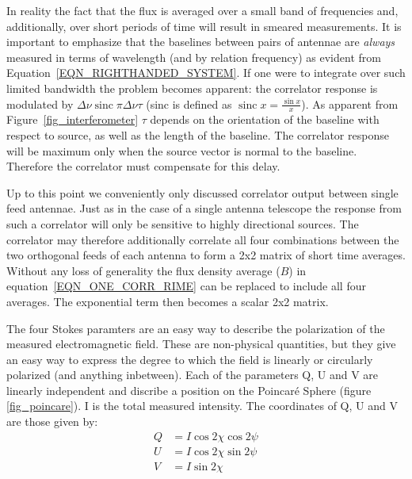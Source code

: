 \documentclass[a4paper,10pt]{report}
\DeclareMathOperator*{\sinc}{sinc}
\begin{document}
In reality the fact that the flux is averaged over a small band of frequencies and, additionally, over short periods of 
time will result in smeared measurements. It is important to emphasize that the baselines between pairs of antennae are 
\textit{always} measured in terms of wavelength (and by relation frequency) as evident from Equation~\ref{EQN_RIGHTHANDED_SYSTEM}.
If one were to integrate over such limited bandwidth the problem becomes apparent: the correlator response
is modulated by $\Delta\nu\sinc{\pi\Delta\nu\tau}$ (sinc is defined as $\sinc{x} = \frac{\sin{x}}{x}$). As apparent from
Figure~\ref{fig_interferometer} $\tau$ depends on the orientation of the baseline with respect to source, as well as the length of the 
baseline. The correlator response will be maximum only when the source vector is normal to the baseline. Therefore the 
correlator must compensate for this delay.

Up to this point we conveniently only discussed correlator output between single feed antennae.
Just as in the case of a single antenna telescope the response from such a correlator will only be sensitive to highly 
directional sources. The correlator may therefore additionally correlate all four combinations between the two orthogonal 
feeds of each antenna to form a 2x2 matrix of short time averages. Without any loss of generality the flux density 
average ($B$) in equation~\ref{EQN_ONE_CORR_RIME} can be replaced to include all four averages. The exponential term 
then becomes a scalar 2x2 matrix.

The four Stokes paramters are an easy way to describe the polarization of the measured electromagnetic field. These 
are non-physical quantities, but they give an easy way to express the degree to which the field is linearly or circularly polarized
(and anything inbetween). Each of the parameters Q, U and V are linearly independent and discribe a position on the 
Poincar\'e Sphere (figure \ref{fig_poincare}). I is the total measured intensity. The coordinates of Q, U and V are
those given by:
\begin{equation}
\begin{split}
Q &= I\cos{2\chi}\cos{2\psi}\\
U &= I\cos{2\chi}\sin{2\psi}\\
V &= I\sin{2\chi}\\
\end{split}
\end{equation}
\end{document}

